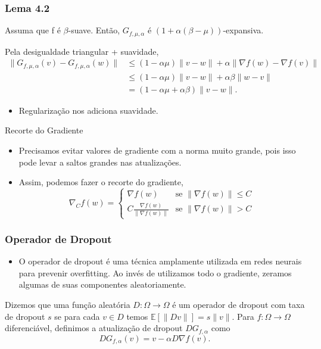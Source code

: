 \documentclass{beamer}
\newcommand{\EE}{\mathbb{E}}
\begin{document}
\begin{frame}
\frametitle{Lema 4.2}
\begin{lemma}[4.2]
Assuma que f é \(\beta\)-suave. Então, \(G_{f,\mu,\alpha}\) é \((1+\alpha(\beta-\mu))\)-expansiva. 
\end{lemma}  
Pela desigualdade triangular + suavidade,
{\small
\begin{align*}
\|G_{f,\mu,\alpha}(v) - G_{f,\mu,\alpha}(w)\| &\le (1-\alpha\mu)\|v-w\| + \alpha\|\nabla f(w) - \nabla f(v)\| \\
&\le (1-\alpha\mu)\|v-w\| + \alpha\beta\|w-v\| \\
&= (1-\alpha\mu+\alpha\beta)\|v-w\|.
\end{align*}  
}
\begin{itemize}
    \item Regularização nos adiciona suavidade.
\end{itemize}
\end{frame}

\begin{frame}{Recorte do Gradiente}
    \begin{itemize}
        \item Precisamos evitar valores de gradiente com a norma muito grande, pois isso pode levar a saltos grandes nas atualizações.
        \item Assim, podemos fazer o recorte do gradiente, 
        $$\nabla_C f(w) = \begin{cases}
        \nabla f(w) & \text{se } \|\nabla f(w)\| \le C \\ C
\frac{\nabla f(w)}{\|\nabla f(w)\|} & \text{se } \|\nabla f(w)\| > C
        \end{cases}$$
    \end{itemize}
\end{frame}

\begin{frame}
\frametitle{Operador de Dropout}
\begin{itemize}
    \item O operador de dropout é uma técnica amplamente utilizada em redes neurais para prevenir overfitting. Ao invés de utilizamos todo o gradiente, zeramos algumas de suas componentes aleatoriamente.
\end{itemize}
\begin{definition}[4.3]
Dizemos que uma função aleatória \(D:\Omega \rightarrow \Omega\) é um operador de dropout com taxa de dropout $s$ se para cada \(v \in D\) temos \(\EE[\|Dv\|]= s\|v\|\). 
Para $f:\Omega \to \Omega$ diferenciável, definimos a atualização de dropout \(DG_{f,\alpha}\) como
$$ DG_{f,\alpha}(v) = v - \alpha D\nabla f(v). $$
\end{definition}
\end{frame}
\end{document}
